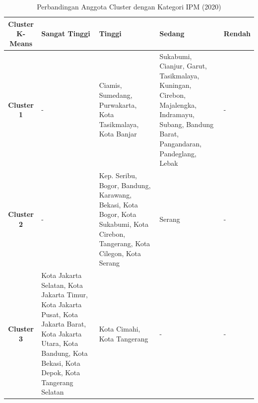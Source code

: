 \begin{table}[H]
\centering
\caption{Perbandingan Anggota Cluster dengan Kategori IPM (2020)} \label{tab:ipm_cross_2020}
\begin{tabular}{|c|p{2cm}|p{2cm}|p{2cm}|p{2cm}|}
\hline
\textbf{Cluster K-Means} & \textbf{Sangat Tinggi} & \textbf{Tinggi} & \textbf{Sedang} & \textbf{Rendah} \\ \hline
\textbf{Cluster 1} & - & Ciamis, Sumedang, Purwakarta, Kota Tasikmalaya, Kota Banjar & Sukabumi, Cianjur, Garut, Tasikmalaya, Kuningan, Cirebon, Majalengka, Indramayu, Subang, Bandung Barat, Pangandaran, Pandeglang, Lebak & - \\ \hline
\textbf{Cluster 2} & - & Kep. Seribu, Bogor, Bandung, Karawang, Bekasi, Kota Bogor, Kota Sukabumi, Kota Cirebon, Tangerang, Kota Cilegon, Kota Serang & Serang & - \\ \hline
\textbf{Cluster 3} & Kota Jakarta Selatan, Kota Jakarta Timur, Kota Jakarta Pusat, Kota Jakarta Barat, Kota Jakarta Utara, Kota Bandung, Kota Bekasi, Kota Depok, Kota Tangerang Selatan & Kota Cimahi, Kota Tangerang & - & - \\ \hline
\end{tabular}
\end{table}